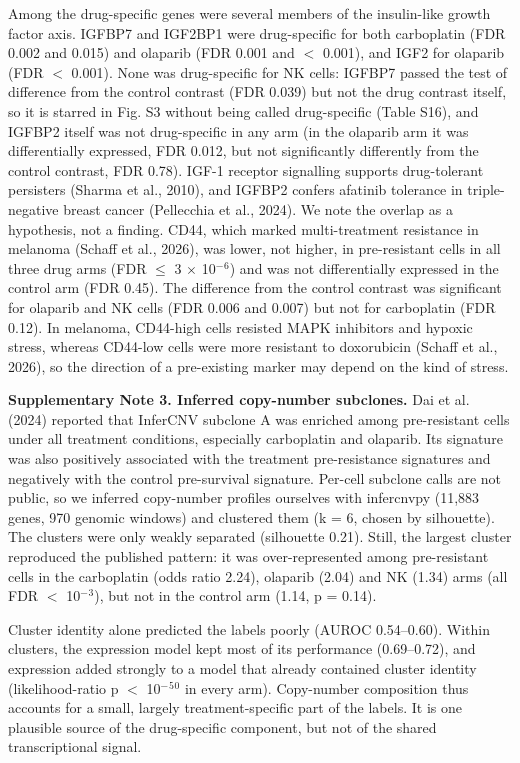 \documentclass[11pt,a4paper]{article}
\begin{document}
Among the drug-specific genes were several members of the insulin-like growth factor axis. IGFBP7 and IGF2BP1 were drug-specific for both carboplatin (FDR 0.002 and 0.015) and olaparib (FDR 0.001 and $<$ 0.001), and IGF2 for olaparib (FDR $<$ 0.001). None was drug-specific for NK cells: IGFBP7 passed the test of difference from the control contrast (FDR 0.039) but not the drug contrast itself, so it is starred in Fig. S3 without being called drug-specific (Table S16), and IGFBP2 itself was not drug-specific in any arm (in the olaparib arm it was differentially expressed, FDR 0.012, but not significantly differently from the control contrast, FDR 0.78). IGF-1 receptor signalling supports drug-tolerant persisters (Sharma et al., 2010), and IGFBP2 confers afatinib tolerance in triple-negative breast cancer (Pellecchia et al., 2024). We note the overlap as a hypothesis, not a finding. CD44, which marked multi-treatment resistance in melanoma (Schaff et al., 2026), was lower, not higher, in pre-resistant cells in all three drug arms (FDR $\leq$ 3 $\times$ 10$^-$$^6$) and was not differentially expressed in the control arm (FDR 0.45). The difference from the control contrast was significant for olaparib and NK cells (FDR 0.006 and 0.007) but not for carboplatin (FDR 0.12). In melanoma, CD44-high cells resisted MAPK inhibitors and hypoxic stress, whereas CD44-low cells were more resistant to doxorubicin (Schaff et al., 2026), so the direction of a pre-existing marker may depend on the kind of stress.

\textbf{Supplementary Note 3. Inferred copy-number subclones.} Dai et al. (2024) reported that InferCNV subclone A was enriched among pre-resistant cells under all treatment conditions, especially carboplatin and olaparib. Its signature was also positively associated with the treatment pre-resistance signatures and negatively with the control pre-survival signature. Per-cell subclone calls are not public, so we inferred copy-number profiles ourselves with infercnvpy (11,883 genes, 970 genomic windows) and clustered them (k = 6, chosen by silhouette). The clusters were only weakly separated (silhouette 0.21). Still, the largest cluster reproduced the published pattern: it was over-represented among pre-resistant cells in the carboplatin (odds ratio 2.24), olaparib (2.04) and NK (1.34) arms (all FDR $<$ 10$^-$$^3$), but not in the control arm (1.14, p = 0.14).

Cluster identity alone predicted the labels poorly (AUROC 0.54--0.60). Within clusters, the expression model kept most of its performance (0.69--0.72), and expression added strongly to a model that already contained cluster identity (likelihood-ratio p $<$ 10$^-$$^5$$^0$ in every arm). Copy-number composition thus accounts for a small, largely treatment-specific part of the labels. It is one plausible source of the drug-specific component, but not of the shared transcriptional signal.
\end{document}
